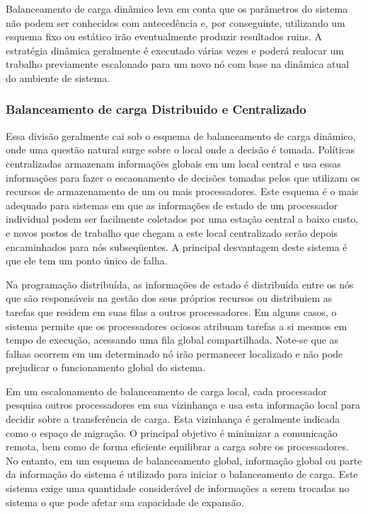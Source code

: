 Balanceamento de carga dinâmico leva em conta que os parâmetros do sistema não podem ser conhecidos com antecedência e, por conseguinte, utilizando um esquema fixo ou estático irão eventualmente produzir resultados ruins. A estratégia dinâmica geralmente é executado várias vezes e poderá realocar um trabalho previamente escalonado para um novo nó com base na dinâmica atual do ambiente de sistema.

\subsubsection{Balanceamento de carga Distribuido e Centralizado}

Essa divisão geralmente cai sob o esquema de balanceamento de carga dinâmico, onde uma questão natural surge sobre o local onde a decisão é tomada. Políticas centralizadas armazenam informações globais em um local central e usa essas informações para fazer o escaonamento de decisões tomadas pelos que utilizam os recursos de armazenamento de um ou mais processadores. Este esquema é o mais adequado para sistemas em que as informações de estado de um processador individual podem ser facilmente coletados por uma estação central a baixo custo, e novos postos de trabalho que chegam a este local centralizado serão depois encaminhados para nós subseqüentes. A principal desvantagem deste sistema é que ele tem um ponto único de falha. 

Na programação distribuída, as informações de estado é distribuída entre os nós que são responsáveis na gestão dos seus próprios recursos ou distribuiem as tarefas que residem em suas filas a outros processadores. Em alguns casos, o sistema permite que os processadores ociosos atribuam tarefas a si mesmos em tempo de execução, acessando uma fila global compartilhada. Note-se que as falhas ocorrem em um determinado nó irão permanecer localizado e não pode prejudicar o funcionamento global do sistema. 

Em um escalonamento de balanceamento de carga local, cada processador pesquisa outros processadores em sua vizinhança e usa esta informação local para decidir sobre a transferência de carga. Esta vizinhança é geralmente indicada como o espaço de migração. O principal objetivo é minimizar a comunicação remota, bem como de forma eficiente equilibrar a carga sobre os processadores. No entanto, em um esquema de balanceamento global, informação global ou  parte da informação do sistema é utilizado para iniciar o balanceamento de carga. Este sistema exige uma quantidade considerável de informações a serem trocadas no sistema o que pode afetar sua capacidade de expansão.

